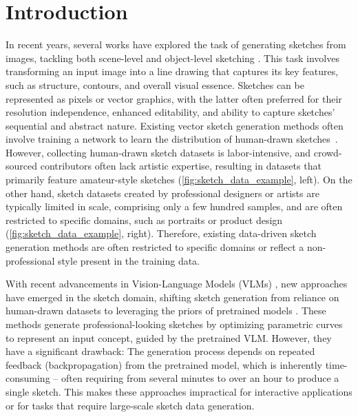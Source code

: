 \section{Introduction}
In recent years, several works have explored the task of generating sketches from images, tackling both scene-level and object-level sketching \cite{Chan2022LearningTG, vinker2022clipasso, Vinker2022CLIPasceneSS, svgdreamer_xing_2023}. This task involves transforming an input image into a line drawing that captures its key features, such as structure, contours, and overall visual essence.
Sketches can be represented as pixels or vector graphics, with the latter often preferred for their resolution independence, enhanced editability, and ability to capture sketches' sequential and abstract nature.
Existing vector sketch generation methods often involve training a network to learn the distribution of human-drawn sketches~\cite{SurveySketchxu2020deep}.
However, collecting human-drawn sketch datasets is labor-intensive, and crowd-sourced contributors often lack artistic expertise, resulting in datasets that primarily feature amateur-style sketches (\cref{fig:sketch_data_example}, left). 
On the other hand, sketch datasets created by professional designers or artists are typically limited in scale, comprising only a few hundred samples, and are often restricted to specific domains, such as portraits or product design (\cref{fig:sketch_data_example}, right). Therefore, existing data-driven sketch generation methods are often restricted to specific domains or reflect a non-professional style present in the training data.

With recent advancements in Vision-Language Models (VLMs) \cite{zhang2024visionlanguagemodelsvisiontasks}, new approaches have emerged in the sketch domain, shifting sketch generation from reliance on human-drawn datasets to leveraging the priors of pretrained models \cite{Frans2021CLIPDrawET,vinker2022clipasso,Vinker2022CLIPasceneSS,Xing2023DiffSketcherTG}.
These methods generate professional-looking sketches by optimizing parametric curves to represent an input concept, guided by the pretrained VLM.
However, they have a significant drawback: The generation process depends on repeated feedback (backpropagation) from the pretrained model, which is inherently time-consuming -- often requiring from several minutes to over an hour to produce a single sketch.
This makes these approaches impractical for interactive applications or for tasks that require large-scale sketch data generation.

